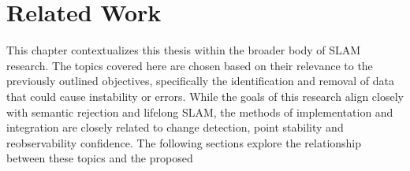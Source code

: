 \section{Related Work}
\label{sec:related_work}

This chapter contextualizes this thesis within the broader body of SLAM research. The topics covered here are chosen based on their relevance to the previously outlined objectives, specifically the identification and removal of data that could cause instability or errors. While the goals of this research align closely with semantic rejection and lifelong SLAM, the methods of implementation and integration are closely related to change detection, point stability and reobservability confidence. The following sections explore the relationship between these topics and the proposed 

% 